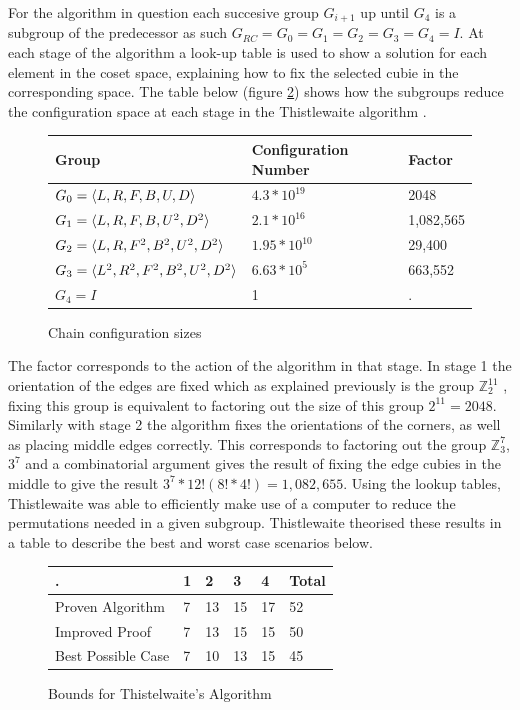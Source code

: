 \documentclass{article}
\DeclarePairedDelimiter{\opair}{\langle}{\rangle}
\newcounter{theo}[section]\setcounter{theo}{0}
\newcounter{lem}[section]\setcounter{lem}{0}
\begin{document}
For the algorithm in question each succesive group $G_{i+1}$ up until $G_4$ is a subgroup of the predecessor as such $G_{RC} = G_0 = G_1 = G_2 = G_3 = G_4= I$. At each stage of the algorithm a look-up table is used to show a solution for each element in the coset space, explaining how to fix the selected cubie in the corresponding space. The table below (figure \ref{:thistletab}) shows how the subgroups reduce the configuration space at each stage in the Thistlewaite algorithm \cite{Thistlethwaite}.
\begin{figure}
\begin{center}
    \begin{tabular}{ | p{6cm} | p{4cm}| p{3cm} |}
    \hline
    Group & Configuration Number & Factor \\ \hline
    $G_{0} = \opair{L,R,F,B,U,D}$ & $4.3*10^{19}$ & 2048\\ \hline
    $G_{1} = \opair{L,R,F,B,U^{2},D^{2}}$ &  $2.1*10^{16}$ & 1,082,565\\ \hline
    $G_{2} = \opair{L,R,F^{2},B^{2},U^{2},D^{2}}$& $1.95*10^{10}$ & 29,400 \\ \hline
    $G_{3} = \opair{L^{2},R^{2},F^{2},B^{2},U^{2},D^{2}}$& $6.63*10^{5}$ & 663,552\\ \hline
    $G_{4} = I$& 1 & .\\ \hline
    \end{tabular}
\end{center}
\caption{Chain configuration sizes}
\label{:thistletab}
\end{figure}
The factor corresponds to the action of the algorithm in that stage. In stage 1 the orientation of the edges are fixed which as explained previously is the group $\mathbb{Z}_{2}^{11}$ , fixing this group is equivalent to factoring out the size of this group $2^{11} = 2048$. Similarly with stage 2 the algorithm fixes the orientations of the corners, as well as placing middle edges correctly. This corresponds to factoring out the group $\mathbb{Z}_{3}^{7}$, $3^7$  and a combinatorial argument gives the result of fixing the edge cubies in the middle to give the result $3^7 * 12!(8!*4!) = 1,082,655$. Using the lookup tables, Thistlewaite was able to efficiently make use of a computer to reduce the permutations needed in a given subgroup. Thistlewaite theorised these results in a table to describe the best and worst case scenarios below.
\begin{figure}
\begin{center}
    \begin{tabular}{ | p{4cm}| p{1.5cm}| p{1.5cm}| p{1.5cm}| p{1.5cm}| p{2cm}|}
    \hline
    . & 1 & 2 & 3 & 4 & Total \\ \hline
    Proven Algorithm & 7 & 13 & 15 & 17 & 52\\ \hline
	Improved Proof & 7 & 13 &15 & 15 & 50\\ \hline
	Best Possible Case & 7 & 10 & 13 & 15 &45\\ \hline
    \end{tabular}
\end{center}
\caption{Bounds for Thistelwaite's Algorithm}
\label{:thistletab}
\end{figure}
\end{document}
